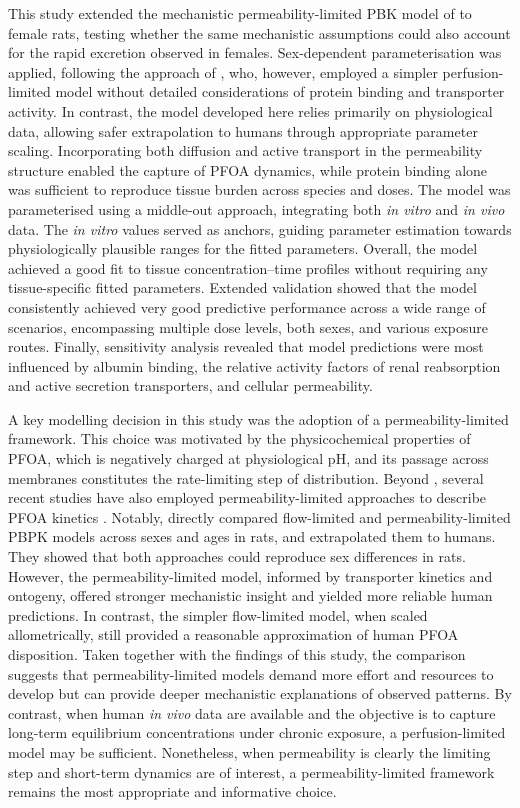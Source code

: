 \documentclass[preprint,12pt,authoryear]{elsarticle}
\begin{document}
This study extended the mechanistic permeability-limited PBK model of \citet{cheng_2017} to female rats, testing whether the same mechanistic assumptions could also account for the rapid excretion observed in females. Sex-dependent parameterisation was applied, following the approach of \citet{worley_2015}, who, however, employed a simpler perfusion-limited model without detailed considerations of protein binding and transporter activity. In contrast, the model developed here relies primarily on physiological data, allowing safer extrapolation to humans through appropriate parameter scaling. Incorporating both diffusion and active transport in the permeability structure enabled the capture of PFOA dynamics, while protein binding alone was sufficient to reproduce tissue burden across species and doses. The model was parameterised using a middle-out approach, integrating both \textit{in vitro} and \textit{in vivo} data. The \textit{in vitro} values served as anchors, guiding parameter estimation towards physiologically plausible ranges for the fitted parameters. Overall, the model achieved a good fit to tissue concentration–time profiles without requiring any tissue-specific fitted parameters. Extended validation showed that the model consistently achieved very good predictive performance across a wide range of scenarios, encompassing multiple dose levels, both sexes, and various exposure routes. Finally, sensitivity analysis revealed that model predictions were most influenced by albumin binding, the relative activity factors of renal reabsorption and active secretion transporters, and cellular permeability. 

 


A key modelling decision in this study was the adoption of a permeability-limited framework. This choice was motivated by the physicochemical properties of PFOA, which is negatively charged at physiological pH, and its passage across membranes constitutes the rate-limiting step of distribution. Beyond \citet{cheng_2017}, several recent studies have also employed permeability-limited approaches to describe PFOA kinetics \citep{karakoltzidis_2025, choi_2024}. Notably, \citet{choi_2024} directly compared flow-limited and permeability-limited PBPK models across sexes and ages in rats, and extrapolated them to humans. They showed that both approaches could reproduce sex differences in rats. However, the permeability-limited model, informed by transporter kinetics and ontogeny, offered stronger mechanistic insight and yielded more reliable human predictions. In contrast, the simpler flow-limited model, when scaled allometrically, still provided a reasonable approximation of human PFOA disposition. Taken together with the findings of this study, the comparison suggests that permeability-limited models demand more effort and resources to develop but can provide deeper mechanistic explanations of observed patterns. By contrast, when human \textit{in vivo} data are available and the objective is to capture long-term equilibrium concentrations under chronic exposure, a perfusion-limited model may be sufficient. Nonetheless, when permeability is clearly the limiting step and short-term dynamics are of interest, a permeability-limited framework remains the most appropriate and informative choice.
\end{document}
